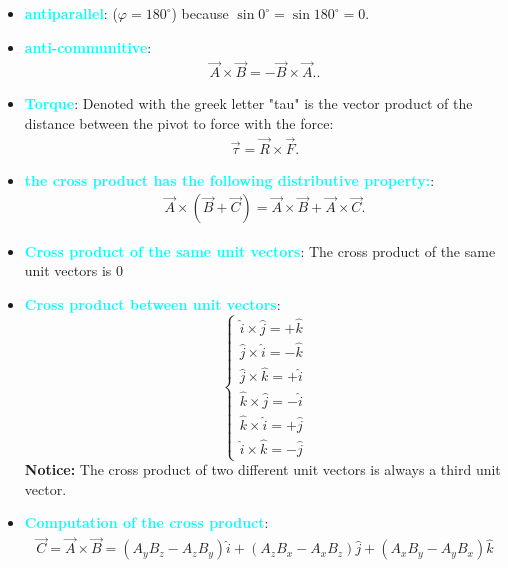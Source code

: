 \documentclass{report}
\begin{document}
\begin{itemize}
    \item \textbf{\textcolor{cyan}{antiparallel}}: ($\varphi=180^\circ$) because $\sin 0^\circ = \sin 180^\circ = 0$.
    \item \textbf{\textcolor{cyan}{anti-communitive}}:
        \begin{align*}
            \vec{A} \times \vec{B} = -\vec{B} \times \vec{A}.
        .\end{align*}
    \item \textbf{\textcolor{cyan}{Torque}}: Denoted with the greek letter "tau" is the vector product of the distance between the pivot to force with the force:
        \begin{align*}
            \vec{\tau} = \vec{R} \times \vec{F}
        .\end{align*}
    \item \textbf{\textcolor{cyan}{the cross product has the following distributive property:}}:
        \begin{align*}
            \vec{A} \times (\vec{B} + \vec{C}) = \vec{A} \times \vec{B} + \vec{A} \times \vec{C}
        .\end{align*}
    \item \textbf{\textcolor{cyan}{Cross product of the same unit vectors}}: The cross product of the same unit vectors is 0
    \item \textbf{\textcolor{cyan}{Cross product between unit vectors}}:
        \begin{equation}
            \begin{cases}
                \hat{i} \times \hat{j} = +\hat{k} \\
                \hat{j} \times \hat{i} = -\hat{k} \\
                \hat{j} \times \hat{k} = +\hat{i} \\
                \hat{k} \times \hat{j} = -\hat{i} \\
                \hat{k} \times \hat{i} = +\hat{j} \\
                \hat{i} \times \hat{k} = -\hat{j}
            \end{cases}
        \end{equation}
        \bigbreak \noindent 
        \textbf{Notice:} The cross product of two different unit vectors is always a third unit vector.
    \item \textbf{\textcolor{cyan}{Computation of the cross product}}:
        \begin{align*}
            \vec{C} = \vec{A} \times \vec{B} = (A_yB_z - A_zB_y)\hat{i} + (A_zB_x - A_xB_z)\hat{j} + (A_xB_y - A_yB_x)\hat{k}

\end{align*}
\end{itemize}
\end{document}
